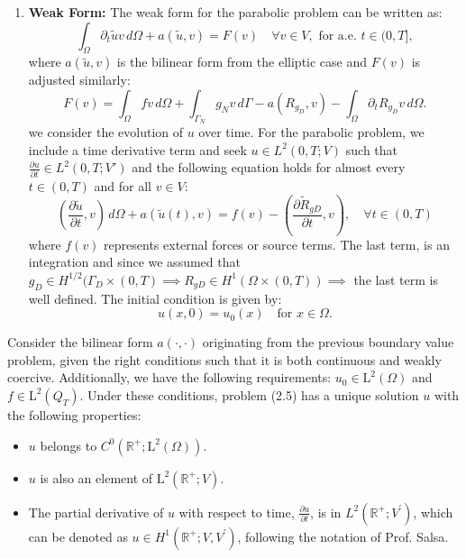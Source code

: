 \documentclass[11pt]{book}
\begin{document}
\begin{enumerate}


\item \textbf{Weak Form:} The weak form for the parabolic problem can be written as:
   \[
   \int_{\Omega} \partial_t \tilde{u} v \, d\Omega + a(\tilde{u}, v) = F(v) \quad \forall v \in V, \text{ for a.e. } t \in (0,T],
   \]
   where \( a(\tilde{u}, v) \) is the bilinear form from the elliptic case and \( F(v) \) is adjusted similarly:
   \[
   F(v) = \int_{\Omega} fv \, d\Omega + \int_{\Gamma_N} g_N v \, d\Gamma - a(R_{g_D},v)- \int_{\Omega} \partial_t R_{g_D} v \, d\Omega  .
   \]
we consider the evolution of \( u \) over time. For the parabolic problem, we include a time derivative term and seek \( u \in L^2(0, T; V) \) such that \( \frac{\partial u}{\partial t} \in L^2(0, T; V') \) and the following equation holds for almost every \( t \in (0, T) \) and for all \( v \in V \):
\[
\left(\frac{\partial \tilde{u}}{\partial t}, v\right) \, d\Omega + a(\tilde{u}(t), v) = f(v) - \left(\frac{\partial \tilde{R}_{gD}}{\partial t}, v\right), \quad \forall t \in (0,T)
\]
where \( f(v) \) represents external forces or source terms. 
The last term, is an integration and since we assumed that $g_D \in H^{1/2}(\Gamma_D \times (0,T) \implies R_{gD}\in H^1(\Omega \times (0,T))\implies $ the last term is well defined. The initial condition is given by:
\[
u(x, 0) = u_0(x) \quad \text{for } x \in \Omega.
\]
\end{enumerate}
Consider the bilinear form $a(\cdot, \cdot)$ originating from the previous boundary value problem, given the right conditions such that it is both continuous and weakly coercive. Additionally, we have the following requirements: $u_{0} \in \mathrm{L}^{2}(\Omega)$ and $f \in \mathrm{L}^{2}(Q_T)$. Under these conditions, problem (2.5) has a unique solution $u$ with the following properties:
\begin{itemize}
  \item $u$ belongs to $C^{0}\left(\mathbb{R}^{+} ; \mathrm{L}^{2}(\Omega)\right)$.
  \item $u$ is also an element of $\mathrm{L}^{2}\left(\mathbb{R}^{+} ; V\right)$.
  \item The partial derivative of $u$ with respect to time, $\frac{\partial u}{\partial t}$, is in $L^{2}\left(\mathbb{R}^{+} ; V^{\prime}\right)$, which can be denoted as $u \in H^{1}\left(\mathbb{R}^{+} ; V, V^{\prime}\right)$, following the notation of Prof. Salsa.
\end{itemize}
\end{document}
